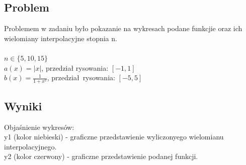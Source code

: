 \documentclass[11pt, a4paper]{article}
\begin{document}
    \subsection{Problem}
    Problemem w zadaniu było pokazanie na wykresach podane funkcjie oraz ich wielomiany interpolacyjne stopnia n.\\
    \\
    $n \in \{5, 10, 15\}$\\
    $a(x) = |x|$, przedział rysowania: $[-1,1]$\\
    $b(x) = \frac{1}{1 + x^2}$, przedział rysowania: $[-5, 5]$
    \subsection{Wyniki}
    Objaśnienie wykresów:\\
    y1 (kolor niebieski) - graficzne przedstawienie wyliczonyego wielomianu interpolacyjnego.\\
    y2 (kolor czerwony) - graficzne przedstawienie podanej funkcji.
\end{document}
